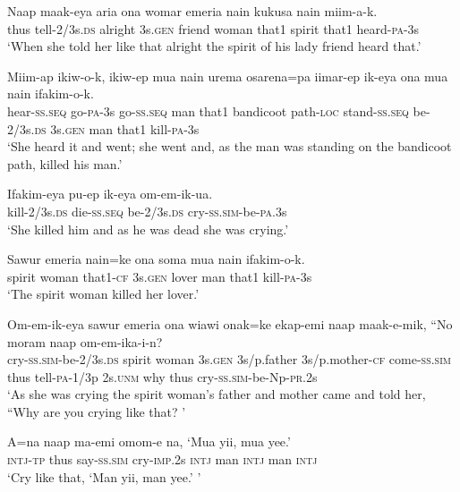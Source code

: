 \ea
\gll  Naap  maak-eya  aria  ona  womar  emeria  nain  kukusa  nain  miim-a-k. \\
thus  tell-2/3s.\textsc{ds}  alright  3s.\textsc{gen}  friend  woman  that1  spirit  that1  heard-\textsc{pa}-3s \\
\glt ‘When she told her like that alright the spirit of his lady friend heard that.’ \\
\z


\ea
\gll  Miim-ap  ikiw-o-k,  ikiw-ep  mua  nain  urema  osarena=pa    iimar-ep  ik-eya  ona  mua  nain  ifakim-o-k. \\
hear-\textsc{ss.seq}  go-\textsc{pa}-3s  go-\textsc{ss.seq}  man  that1  bandicoot  path-\textsc{loc}  stand-\textsc{ss.seq}  be-2/3s.\textsc{ds}  3s.\textsc{gen}  man  that1  kill-\textsc{pa}-3s \\


\glt ‘She heard it and went; she went and, as the man was standing on the bandicoot path, killed his man.’ \\
\z


\ea
\gll  Ifakim-eya  pu-ep  ik-eya  om-em-ik-ua. \\
kill-2/3s.\textsc{ds}  die-\textsc{ss.seq}  be-2/3s.\textsc{ds}  cry-\textsc{ss}.\textsc{sim}-be-\textsc{pa}.3s \\
\glt ‘She killed him and as he was dead she was crying.’ \\
\z


\ea
\gll  Sawur  emeria  nain=ke  ona  soma  mua  nain  ifakim-o-k. \\
spirit  woman  that1-\textsc{cf}  3s.\textsc{gen}  lover  man  that1  kill-\textsc{pa}-3s \\
\glt ‘The spirit woman killed her lover.’ \\
\z


\ea
\gll  Om-em-ik-eya  sawur  emeria  ona  wiawi  onak=ke                     ekap-emi  naap  maak-e-mik,  “No  moram  naap  om-em-ika-i-n? \\
cry-\textsc{ss}.\textsc{sim}-be-2/3s.\textsc{ds}  spirit  woman  3s.\textsc{gen}  3s/p.father  3s/p.mother-\textsc{cf}  come-\textsc{ss}.\textsc{sim}  thus  tell-\textsc{pa}-1/3p  2s.\textsc{unm}  why  thus  cry-\textsc{ss}.\textsc{sim}-be-Np-\textsc{pr}.2s \\


\glt ‘As she was crying the spirit woman’s father and mother came and told her, “Why are you crying like that? ’ \\
\z


\ea
\gll  A=na  naap  ma-emi  omom-e  na,  ‘Mua  yii,  mua  yee.’ \\
\textsc{intj}-\textsc{tp}  thus  say-\textsc{ss}.\textsc{sim}  cry-\textsc{imp}.2s  \textsc{intj}  man  \textsc{intj}  man  \textsc{intj} \\
\glt ‘Cry like that, ‘Man yii, man yee.’ ’ \\
\z


